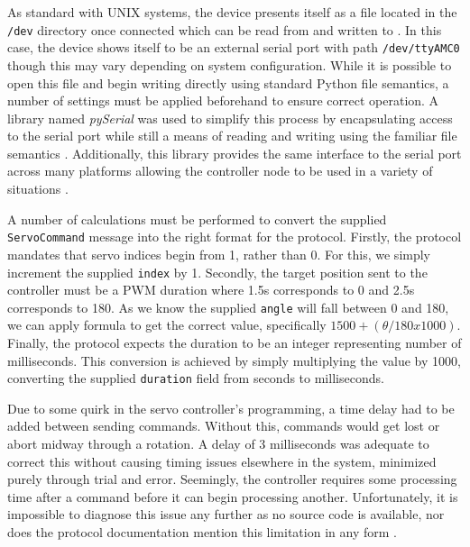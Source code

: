 As standard with UNIX systems, the device presents itself as a file located in the \texttt{/dev} directory once connected which can be read from and written to \cite{unix_devices}. In this case, the device shows itself to be an external serial port with path \texttt{/dev/ttyAMC0} though this may vary depending on system configuration. While it is possible to open this file and begin writing directly using standard Python file semantics, a number of settings must be applied beforehand to ensure correct operation. A library named \emph{pySerial} was used to simplify this process by encapsulating access to the serial port while still a means of reading and writing using the familiar file semantics \cite{pyserial}. Additionally, this library provides the same interface to the serial port across many platforms allowing the controller node to be used in a variety of situations \cite{pyserial}.

A number of calculations must be performed to convert the supplied \texttt{ServoCommand} message into the right format for the protocol. Firstly, the protocol mandates that servo indices begin from 1, rather than 0. For this, we simply increment the supplied \texttt{index} by 1. Secondly, the target position sent to the controller must be a PWM duration where 1.5\textmu{}s corresponds to 0\textdegree{} and 2.5\textmu{}s corresponds to 180\textdegree{}. As we know the supplied \texttt{angle} will fall between 0 and 180, we can apply formula to get the correct value, specifically $1500 + (\theta / 180 x 1000)$. Finally, the protocol expects the duration to be an integer representing number of milliseconds. This conversion is achieved by simply multiplying the value by 1000, converting the supplied \texttt{duration} field from seconds to milliseconds.

Due to some quirk in the servo controller's programming, a time delay had to be added between sending commands. Without this, commands would get lost or abort midway through a rotation. A delay of 3 milliseconds was adequate to correct this without causing timing issues elsewhere in the system, minimized purely through trial and error. Seemingly, the controller requires some processing time after a command before it can begin processing another. Unfortunately, it is impossible to diagnose this issue any further as no source code is available, nor does the protocol documentation mention this limitation in any form \cite{torobot_manual}.


